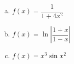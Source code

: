 \begin{enumerate}
\begin{enumerate}[(a)]
\item \(f(x) = \dfrac{1}{1+4x^2}\)

\vspace*{.75in}

\item \(f(x) = \ln\left|\dfrac{1+x}{1-x}\right|\)

\vspace*{.75in}

\item \(f(x) = x^3 \sin x^2\)

\vspace*{.75in}



\end{enumerate}



%
%


\end{enumerate}

